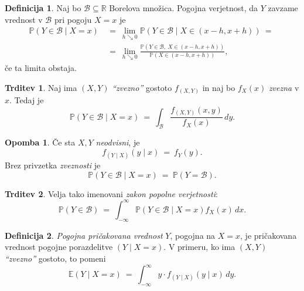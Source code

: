 \documentclass[11pt]{article}
\newcommand{\p}{\mathbb{P}}
\newcommand{\E}{\mathbb{E}}
\newcommand{\R}{\mathbb{R}}
\newcommand{\1}{\mathbbm{1}}
\newcommand{\B}{\mathcal{B}}
\theoremstyle{definition}
\newtheorem{definicija}{Definicija}[section]
\theoremstyle{definition}
\newtheorem{trditev}{Trditev}[section]
\theoremstyle{definition}
\newtheorem*{opomba}{Opomba}
\begin{document}
\begin{definicija}

Naj bo $\B \subseteq \R$ Borelova množica. Pogojna verjetnost, da $Y$ zavzame vrednost v $\B$ pri pogoju $X=x$ je
\begin{align*}
\p(Y \in \B \mid X=x) ~&=~ \lim_{h \searrow 0} \p(Y \in \B \mid X \in (x-h, x+h)) ~=~ \\
~&=~ \lim_{h \searrow 0} \frac{\p(Y \in \B,~ X \in (x-h, x+h))}{\p(X \in (x-h, x+h))},
\end{align*}
če ta limita obstaja.

\end{definicija}
\vspace{0.5cm}

\begin{trditev}

Naj ima $(X, Y)$ \textit{``zvezno''} gostoto $f_{(X, Y)}$ in naj bo $f_X(x)$ \textit{zvezna} v $x$. Tedaj je
$$\p(Y \in \B \mid X=x) ~=~ \int_\B \frac{f_{(X, Y)}(x, y)}{f_X(x)}\,dy.$$

\end{trditev}
\vspace{0.5cm}

\begin{opomba}

Če sta $X, Y$ \textit{neodvisni}, je 
$$f_{(Y \mid X)}(y \mid x) ~=~ f_Y(y).$$
Brez privzetka \textit{zveznosti} je 
$$\p(Y \in \B \mid X=x) ~=~ \p(Y = \B).$$

\end{opomba}
\vspace{0.5cm}

\begin{trditev}

Velja tako imenovani \textit{zakon popolne verjetnosti}:
$$\p(Y \in \B) ~=~ \int_{-\infty}^\infty \p(Y \in \B \mid X=x)f_X(x)\,dx.$$

\end{trditev}
\vspace{0.5cm}

\begin{definicija}

\textit{Pogojna pričakovana vrednost} $Y$, pogojna na $X=x$, je pričakovana vrednost pogojne porazdelitve $(Y \mid X=x)$. V primeru, ko ima $(X, Y)$ \textit{``zvezno''} gostoto, to pomeni
$$\E(Y \mid X=x) ~=~ \int_{-\infty}^\infty y \cdot f_{(Y \mid X)}(y \mid x)\,dy.$$

\end{definicija}
\vspace{0.5cm}
\end{document}
